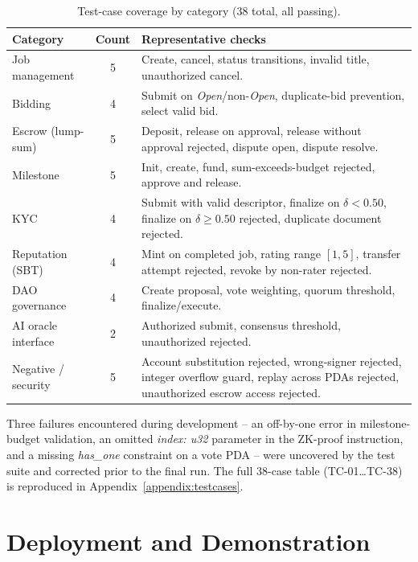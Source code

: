 \begin{table}[H]
\centering
\caption{Test-case coverage by category (38 total, all passing).}
\label{table:test_categories}
\small
\begin{tabular}{|l|c|p{6.5cm}|}
\hline
\textbf{Category} & \textbf{Count} & \textbf{Representative checks} \\ \hline
Job management & 5 & Create, cancel, status transitions, invalid title, unauthorized cancel. \\ \hline
Bidding & 4 & Submit on \emph{Open}/non-\emph{Open}, duplicate-bid prevention, select valid bid. \\ \hline
Escrow (lump-sum) & 5 & Deposit, release on approval, release without approval rejected, dispute open, dispute resolve. \\ \hline
Milestone & 5 & Init, create, fund, sum-exceeds-budget rejected, approve and release. \\ \hline
KYC & 4 & Submit with valid descriptor, finalize on $\delta < 0.50$, finalize on $\delta \geq 0.50$ rejected, duplicate document rejected. \\ \hline
Reputation (SBT) & 4 & Mint on completed job, rating range $[1,5]$, transfer attempt rejected, revoke by non-rater rejected. \\ \hline
DAO governance & 4 & Create proposal, vote weighting, quorum threshold, finalize/execute. \\ \hline
AI oracle interface & 2 & Authorized submit, consensus threshold, unauthorized rejected. \\ \hline
Negative / security & 5 & Account substitution rejected, wrong-signer rejected, integer overflow guard, replay across PDAs rejected, unauthorized escrow access rejected. \\ \hline
\end{tabular}
\end{table}

\noindent Three failures encountered during development -- an off-by-one error in milestone-budget validation, an omitted \emph{index: u32} parameter in the ZK-proof instruction, and a missing \emph{has\_one} constraint on a vote PDA -- were uncovered by the test suite and corrected prior to the final run. The full 38-case table (TC-01\ldots TC-38) is reproduced in Appendix~\ref{appendix:testcases}.

\section{Deployment and Demonstration}
\label{section:4.5}

